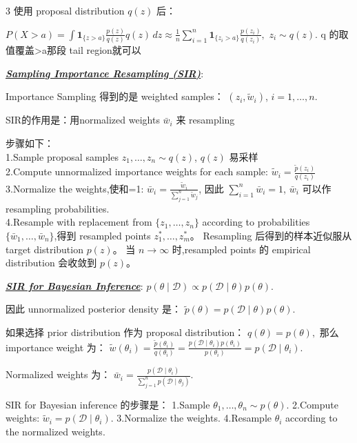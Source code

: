 \documentclass[12pt]{article}
\newcommand{\bulletPoint}[1]{\underline{\textit{\textbf{#1}}}}
\begin{document}
\begin{multicols*}{3}
使用 proposal distribution $q(z)$ 后：


$
P(X>a)
=
\int
\mathbf 1_{\{z>a\}}
\frac{p(z)}{q(z)}
q(z)\,dz
\approx
\frac{1}{n}
\sum_{i=1}^n
\mathbf 1_{\{z_i>a\}}
\frac{p(z_i)}{q(z_i)},
$
$
z_i\sim q(z).
$
q 的取值覆盖>a那段 tail region就可以


\bulletPoint{Sampling Importance Resampling (SIR)}:

Importance Sampling 得到的是 weighted samples：
$
(z_i,\tilde w_i)$,
$i=1,\dots,n$.

SIR的作用是：用normalized weights $\bar w_i$ 来 resampling 

步骤如下：\\
1.Sample proposal samples $z_1,\dots,z_n\sim q(z)$, $q(z)$ 易采样\\
2.Compute unnormalized importance weights for each sample:
$\tilde w_i=\frac{\tilde p(z_i)}{q(z_i)}$\\
3.Normalize the weights,使和=1:
$\bar w_i=
\frac{\tilde w_i}
{\sum_{j=1}^n \tilde w_j}$,
因此 $\sum_{i=1}^n \bar w_i=1$, $\bar w_i$ 可以作 resampling probabilities.\\
4.Resample with replacement from 
$\{z_1,\dots,z_n\}$
according to probabilities 
$\{\bar w_1,\dots,\bar w_n\}$,得到 resampled points
$z_1^*,\dots,z_m^*$。
Resampling 后得到的样本近似服从 target distribution $p(z)$。
当 $n\to\infty$ 时,resampled points 的 empirical distribution 会收敛到 $p(z)$。


\bulletPoint{SIR for Bayesian Inference}:
$
p(\theta\mid \mathcal D)
\propto
p(\mathcal D\mid \theta)p(\theta).
$

因此 unnormalized posterior density 是：
$
\tilde p(\theta)
=
p(\mathcal D\mid \theta)p(\theta).
$

如果选择 prior distribution 作为 proposal distribution：
$
q(\theta)=p(\theta),
$
那么 importance weight 为：
$
\tilde w(\theta_i)
=
\frac{
\tilde p(\theta_i)
}{
q(\theta_i)
}
=
\frac{
p(\mathcal D\mid \theta_i)p(\theta_i)
}{
p(\theta_i)
}=
p(\mathcal D\mid \theta_i).
$

Normalized weights 为：
$
\bar w_i
=
\frac{
p(\mathcal D\mid \theta_i)
}{
\sum_{j=1}^n p(\mathcal D\mid \theta_j)
}.
$

SIR for Bayesian inference 的步骤是：
1.Sample $\theta_1,\dots,\theta_n\sim p(\theta)$.
2.Compute weights: $\tilde w_i=p(\mathcal D\mid \theta_i)$.
3.Normalize the weights.
4.Resample $\theta_i$ according to the normalized weights.



\end{multicols*}
\end{document}

